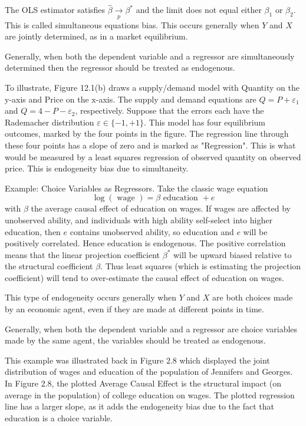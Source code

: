 \documentclass[10pt]{article}
\begin{document}
The OLS estimator satisfies $\widehat{\beta} \underset{p}{\rightarrow} \beta^{*}$ and the limit does not equal either $\beta_{1}$ or $\beta_{2}$. This is called simultaneous equations bias. This occurs generally when $Y$ and $X$ are jointly determined, as in a market equilibrium.

Generally, when both the dependent variable and a regressor are simultaneously determined then the regressor should be treated as endogenous.

To illustrate, Figure 12.1(b) draws a supply/demand model with Quantity on the y-axis and Price on the $\mathrm{x}$-axis. The supply and demand equations are $Q=P+\varepsilon_{1}$ and $Q=4-P-\varepsilon_{2}$, respectively. Suppose that the errors each have the Rademacher distribution $\varepsilon \in\{-1,+1\}$. This model has four equilibrium outcomes, marked by the four points in the figure. The regression line through these four points has a slope of zero and is marked as "Regression". This is what would be measured by a least squares regression of observed quantity on observed price. This is endogeneity bias due to simultaneity.

Example: Choice Variables as Regressors. Take the classic wage equation
$$
\log (\text { wage })=\beta \text { education }+e
$$
with $\beta$ the average causal effect of education on wages. If wages are affected by unobserved ability, and individuals with high ability self-select into higher education, then $e$ contains unobserved ability, so education and $e$ will be positively correlated. Hence education is endogenous. The positive correlation means that the linear projection coefficient $\beta^{*}$ will be upward biased relative to the structural coefficient $\beta$. Thus least squares (which is estimating the projection coefficient) will tend to over-estimate the causal effect of education on wages.

This type of endogeneity occurs generally when $Y$ and $X$ are both choices made by an economic agent, even if they are made at different points in time.

Generally, when both the dependent variable and a regressor are choice variables made by the same agent, the variables should be treated as endogenous.

This example was illustrated back in Figure $2.8$ which displayed the joint distribution of wages and education of the population of Jennifers and Georges. In Figure 2.8, the plotted Average Causal Effect is the structural impact (on average in the population) of college education on wages. The plotted regression line has a larger slope, as it adds the endogeneity bias due to the fact that education is a choice variable.
\end{document}
